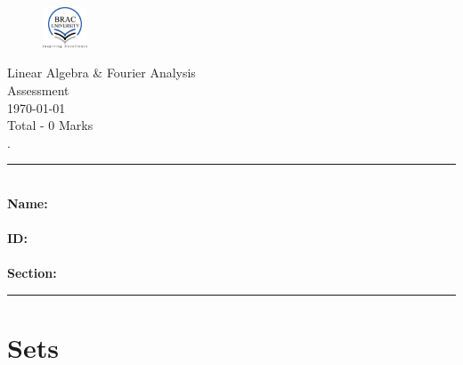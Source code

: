 \documentclass[12pt,letterpaper, onecolumn]{exam}
\begin{document}
\begingroup
\centering
\begin{figure}
    \centering
    \includegraphics[width=50px]{brac-university-logo.png}
\end{figure}
\LARGE Linear Algebra \& Fourier Analysis\\
\LARGE Assessment\\
\large \today\\
\large Total - 0 Marks\\.\\%
\endgroup
\hrule
\pointsdroppedatright   %
\printanswers
\renewcommand{\solutiontitle}{\noindent\textbf{Ans:}\enspace}   %
\textcolor{white}{text} \\
\textbf{\large Name:}\\ \\
\textbf{\large ID:}\\ \\
\textbf{\large Section:}\\
\hrule
\vspace{10pt} 
\section{Sets}

\newcommand{\answerspace}[1][1.5cm]{%
    \vspace{#1}
    \rule{\linewidth}{0.3pt}\vspace{0.2cm}
}
\end{document}
